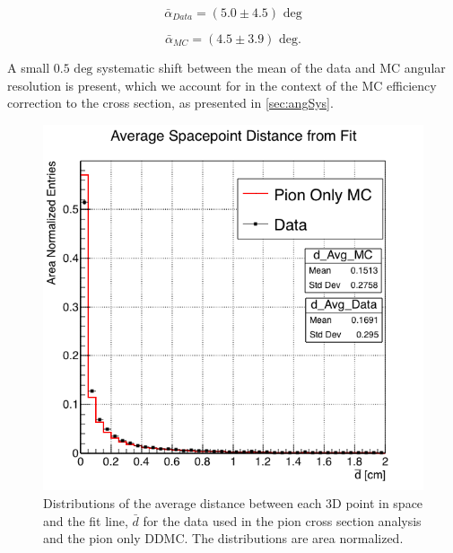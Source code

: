 \begin{equation}
\bar\alpha_{Data} = (5.0 \pm 4.5) \text{ deg} 
\end{equation}

\begin{equation}
\bar\alpha_{MC} = (4.5 \pm 3.9) \text{ deg}. 
\end{equation}

A small $0.5 \text{ deg}$ systematic shift between the mean of the data and MC angular resolution is present, which we account for in the context of the MC efficiency correction to the cross section, as presented in \ref{sec:angSys}.



\begin{figure}[ht]
\begin{minipage}[t]{0.45\linewidth}
\centering
\includegraphics[width=\textwidth]{Studies/Figures/cDAvg.png}
\caption[]{Distributions of the average distance between each 3D point in space and the fit line,  $\bar d$ for the data used in the pion cross section analysis and the pion only DDMC. The distributions are area normalized. } \label{fig:Chi2AllPts}
\end{minipage}
\hspace{0.5cm}
\begin{minipage}[t]{0.45\linewidth}
\centering

\end{minipage}
\end{figure}
